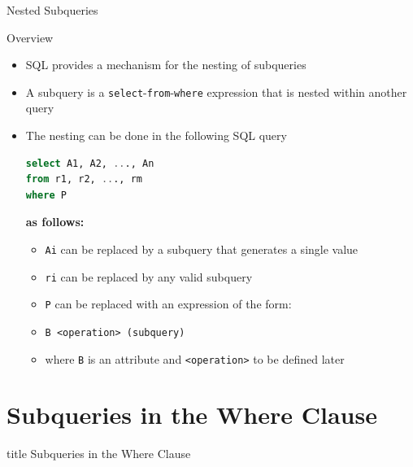 \documentclass[aspectratio=169, xcolor=dvipsnames]{beamer}
\begin{document}
\begin{frame}[fragile]{Nested Subqueries}
    \begin{block}{Overview}
        \begin{itemize}[<+->]
            \item SQL provides a mechanism for the nesting of subqueries
            \item A subquery is a \texttt{select}-\texttt{from}-\texttt{where} expression that is nested within another query
            \item The nesting can be done in the following SQL query
            \begin{lstlisting}[language=SQL]
select A1, A2, ..., An 
from r1, r2, ..., rm
where P
            \end{lstlisting}
            \textbf{as follows:}
            \begin{itemize}
                \item[$\triangleright$] \texttt{Ai} can be replaced by a subquery that generates a single value
                \item[$\triangleright$] \texttt{ri} can be replaced by any valid subquery
                \item[$\triangleright$] \texttt{P} can be replaced with an expression of the form:
                \item[$\triangleright$] \texttt{B <operation> (subquery)}
                \item[$\triangleright$] where \texttt{B} is an attribute and \texttt{<operation>} to be defined later
            \end{itemize}
        \end{itemize}
    \end{block}
\end{frame}

\section{Subqueries in the Where Clause}

\begin{frame}
  \vfill
  \centering
  \begin{beamercolorbox}[sep=8pt,center,shadow=true,rounded=true]{title}
    Subqueries in the Where Clause\par%
  \end{beamercolorbox}
  \vfill
\end{frame}
\end{document}

